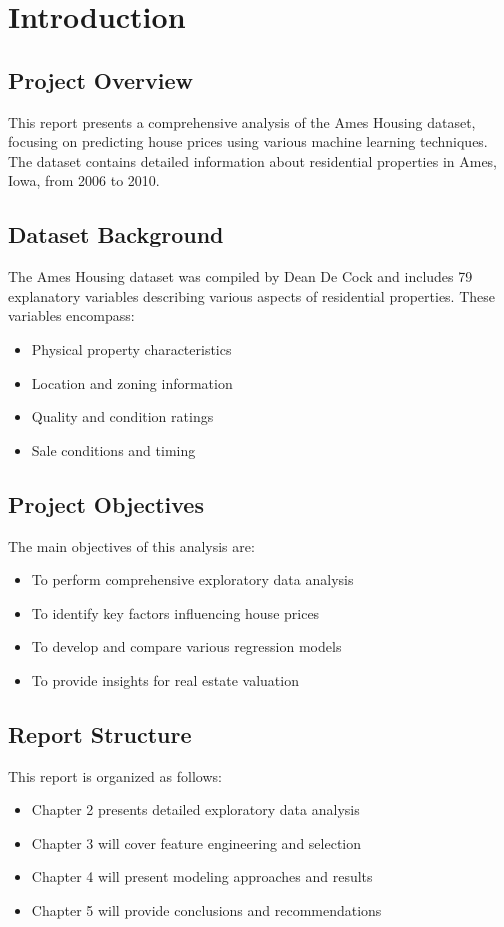 \chapter{Introduction}

\section{Project Overview}
This report presents a comprehensive analysis of the Ames Housing dataset, focusing on predicting house prices using various machine learning techniques. The dataset contains detailed information about residential properties in Ames, Iowa, from 2006 to 2010.

\section{Dataset Background}
The Ames Housing dataset was compiled by Dean De Cock and includes 79 explanatory variables describing various aspects of residential properties. These variables encompass:
\begin{itemize}
    \item Physical property characteristics
    \item Location and zoning information
    \item Quality and condition ratings
    \item Sale conditions and timing
\end{itemize}

\section{Project Objectives}
The main objectives of this analysis are:
\begin{itemize}
    \item To perform comprehensive exploratory data analysis
    \item To identify key factors influencing house prices
    \item To develop and compare various regression models
    \item To provide insights for real estate valuation
\end{itemize}

\section{Report Structure}
This report is organized as follows:
\begin{itemize}
    \item Chapter 2 presents detailed exploratory data analysis
    \item Chapter 3 will cover feature engineering and selection
    \item Chapter 4 will present modeling approaches and results
    \item Chapter 5 will provide conclusions and recommendations
\end{itemize} 
